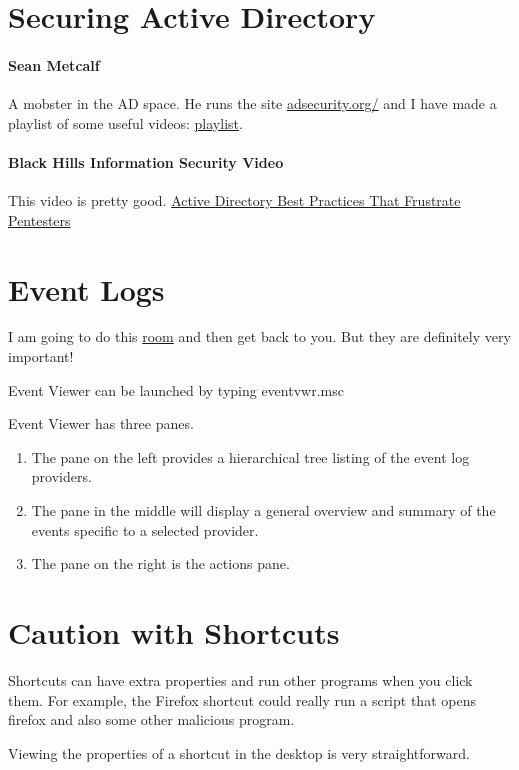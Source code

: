 \documentclass{article}
\begin{document}
\section{Securing Active Directory}

\paragraph{Sean Metcalf}
A mobster in the AD space. He runs the site \href{https://adsecurity.org/}{adsecurity.org/}
and I have made a playlist of some useful videos: \href{https://www.youtube.com/playlist?list=PLHkV-wwoQ7s_7vUau-eqiscWoZZNC3EcZ}{playlist}.

\paragraph{Black Hills Information Security Video}
This video is pretty good. \href{https://youtu.be/SdNPUhzYTUc?si=FNYSbLUqm-2Kurxp}{Active Directory Best Practices That Frustrate Pentesters}

\section{Event Logs}
I am going to do this \href{https://tryhackme.com/room/windowseventlogs}{room} and then get back to you.
But they are definitely very important!

Event Viewer can be launched by typing eventvwr.msc

Event Viewer has three panes.
\begin{enumerate}
\item The pane on the left provides a hierarchical tree listing of the event log providers.
\item The pane in the middle will display a general overview and summary of the events specific to a selected provider.
\item The pane on the right is the actions pane.
\end{enumerate}

\section{Caution with Shortcuts}
Shortcuts can have extra properties and run other programs when you click them.
For example, the Firefox shortcut could really run a script that opens firefox and also some
other malicious program.

\noindent Viewing the properties of a shortcut in the desktop is very straightforward.
\end{document}
